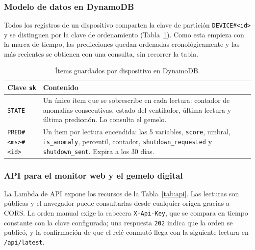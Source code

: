 \documentclass[10pt,twocolumn]{article}
\newcommand{\code}[1]{\texttt{\small #1}}
\begin{document}
\subsubsection{Modelo de datos en DynamoDB}
Todos los registros de un dispositivo comparten la clave de partición \code{DEVICE\#<id>} y se
distinguen por la clave de ordenamiento (Tabla~\ref{tab:dynamo}). Como esta empieza con la marca de
tiempo, las predicciones quedan ordenadas cronológicamente y las más recientes se obtienen con una
consulta, sin recorrer la tabla.

\begin{table}[H]
\centering
\caption{Ítems guardados por dispositivo en DynamoDB.}
\label{tab:dynamo}
\scriptsize
\begin{tabularx}{\columnwidth}{@{}>{\raggedright\arraybackslash}p{1.75cm}>{\raggedright\arraybackslash}X@{}}
\toprule
\textbf{Clave \code{sk}} & \textbf{Contenido} \\
\midrule
\code{STATE} & Un único ítem que se sobrescribe en cada lectura: contador de anomalías
consecutivas, estado del ventilador, última lectura y última predicción. Lo consulta el gemelo. \\
\code{PRED\#<ms>\#<id>} & Un ítem por lectura encendida: las 5 variables, \code{score}, umbral,
\code{is\_anomaly}, percentil, contador, \code{shutdown\_requested} y \code{shutdown\_sent}. Expira
a los 30 días. \\
\bottomrule
\end{tabularx}
\end{table}

\subsubsection{API para el monitor web y el gemelo digital}
La Lambda de API expone los recursos de la Tabla~\ref{tab:api}. Las lecturas son públicas y el
navegador puede consultarlas desde cualquier origen gracias a CORS. La orden manual exige la
cabecera \code{X-Api-Key}, que se compara en tiempo constante con la clave configurada; una
respuesta \code{202} indica que la orden se publicó, y la confirmación de que el relé conmutó llega
con la siguiente lectura en \code{/api/latest}.
\end{document}
